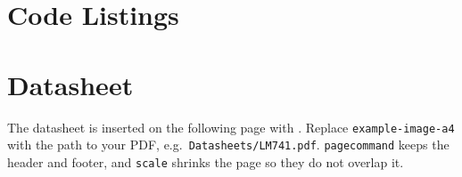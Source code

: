 \appendix
{} %

\chapter{Code Listings}
\label{app:code}

\lipsum[6]

\chapter{Datasheet}
\label{app:datasheet}

The datasheet is inserted on the following page with \verb||.
Replace \texttt{example-image-a4} with the path to your PDF, e.g.\
\texttt{Datasheets/LM741.pdf}. \verb|pagecommand| keeps the header and
footer, and \verb|scale| shrinks the page so they do not overlap it.


